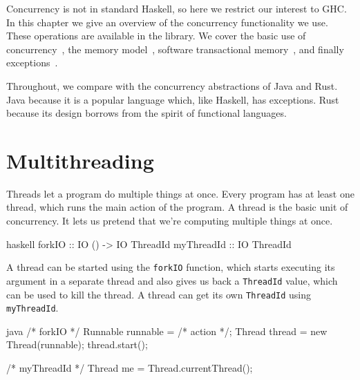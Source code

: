 Concurrency is not in standard Haskell, so here we restrict our
interest to GHC\@.  In this chapter we give an overview of the
concurrency functionality we use.  These operations are available in
the  library.  We cover the basic use of
concurrency~, the memory
model~, software transactional
memory~, and finally
exceptions~.

Throughout, we compare with the concurrency abstractions of Java and
Rust.  Java because it is a popular language which, like Haskell, has
exceptions.  Rust because its design borrows from the spirit of
functional languages.

\section{Multithreading}
\label{sec:concurrent_haskell-threads}

Threads let a program do multiple things at once.  Every program has
at least one thread, which runs the main action of the program.  A
thread is the basic unit of concurrency.  It lets us pretend that
we're computing multiple things at once.

\begin{listing}
\centering
\begin{cminted}{haskell}
forkIO     :: IO () -> IO ThreadId
myThreadId :: IO ThreadId
\end{cminted}
\caption{Basic threading operations in Haskell.}\label{lst:basic_haskell}
\end{listing}

A thread can be started using the \verb|forkIO| function, which starts
executing its argument in a separate thread and also gives us back a
\verb|ThreadId| value, which can be used to kill the thread.  A thread
can get its own \verb|ThreadId| using \verb|myThreadId|.

\pagebreak

\begin{listing}
\centering
\begin{cminted}{java}
/* forkIO */
Runnable runnable = /* action */;
Thread thread = new Thread(runnable);
thread.start();

/* myThreadId */
Thread me = Thread.currentThread();
\end{cminted}
\caption{Basic threading operations in Java.}\label{lst:basic_java}
\end{listing}

